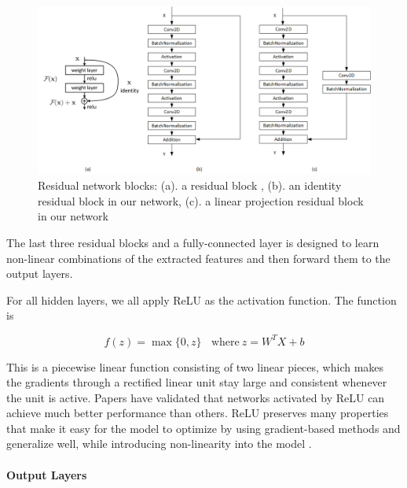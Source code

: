 \documentclass[a4paper,12pt]{article}
\begin{document}
\begin{figure}[H]		
	\includegraphics[width=1\textwidth]{residual_blocks.png}
	\caption[Residual network blocks.]{Residual network blocks: (a). a residual block \cite{DBLP:journals/corr/HeZRS15}, (b). an identity residual block in our network, (c). a linear projection residual block in our network}
	\centering
	\label{figure:residual_blocks}
\end{figure}

The last three residual blocks and a fully-connected layer is designed to learn non-linear combinations of the extracted features and then forward them to the output layers.

For all hidden layers, we all apply ReLU as the activation function. The function is

\begin{equation}
\label{relu}
f(z) = \max \{0, z\} ~~~~\text{where}~ z = W^TX+b
\end{equation}

This is a piecewise linear function consisting of two linear pieces, which makes the gradients through a rectified linear unit stay large and consistent whenever the unit is active. Papers \cite{pmlr-v15-glorot11a, Nair:2010:RLU:3104322.3104425, DBLP:journals/corr/JarrettKGL16} have validated that networks activated by ReLU can achieve much better performance than others. ReLU preserves many properties that make it easy for the model to optimize by using gradient-based methods and generalize well, while introducing non-linearity into the model \cite{Goodfellow-et-al-2016}. 

\paragraph{Output Layers} 
\label{output}
\end{document}
